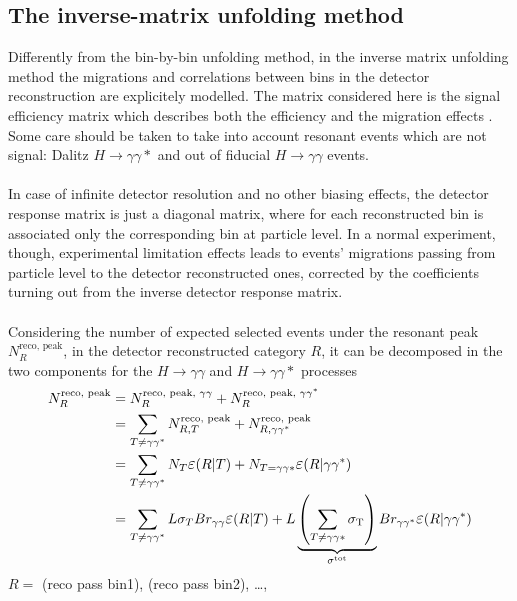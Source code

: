 \subsection{The inverse-matrix unfolding method}
\label{matrix_sec}
Differently from the bin-by-bin unfolding method, in the inverse matrix unfolding method the migrations and correlations between bins in the detector reconstruction are explicitely modelled. The matrix considered here is the signal efficiency matrix which describes both the efficiency and the migration effects \cite{article_matrix_method}. Some care should be taken to take into account resonant events which are not signal: Dalitz $H \rightarrow \gamma\gamma *$ and out of fiducial $H \rightarrow \gamma\gamma$ events.
\\\\
In case of infinite detector resolution and no other biasing effects, the detector response matrix is just a diagonal matrix, where for each reconstructed bin is associated only the corresponding bin at particle level. In a normal experiment, though, experimental limitation effects leads to events' migrations passing from particle level to the detector reconstructed ones, corrected by the coefficients turning out from the inverse detector response matrix.
\\\\
Considering the number of expected selected events under the resonant peak $N^\text{reco, peak}_R$, in the detector reconstructed category $R$, it can be decomposed in the two components for the $H \rightarrow \gamma\gamma$ and $H \rightarrow \gamma\gamma *$ processes
\begin{align}
N^\text{reco, peak}_R &= N^\text{reco, peak, $\gamma\gamma$}_R + N^\text{reco, peak, $\gamma\gamma^*$}_R \\
&= \sum_{T\neq \gamma\gamma^*} N^\text{reco, peak}_{R,T} + N^\text{reco, peak}_{R, \gamma\gamma^*} \\
&= \sum_{T\neq \gamma\gamma^*} N_{T}\mathlarger{\varepsilon}(R|T) + N_{T=\gamma\gamma*}\mathlarger{\varepsilon}(R|\gamma\gamma^*) \\
&= \sum_{T\neq \gamma\gamma^*} L \sigma_T Br_{\gamma\gamma} \mathlarger{\varepsilon}(R|T) + L\underbrace{\left(\sum_{T\neq\gamma\gamma*}\sigma_\text{T}\right)}_{\sigma^\text{tot}} Br_{\gamma\gamma^*} \mathlarger{\varepsilon}(R|\gamma\gamma^*)
\end{align}
\phantom{i}\hspace{0.5cm}$R = $ (reco pass bin1), (reco pass bin2), \ldots,
\\
